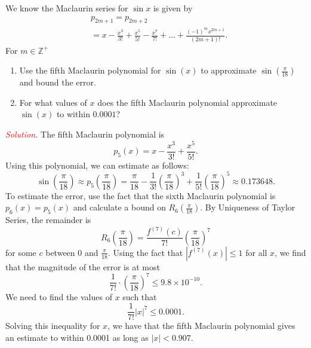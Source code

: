 \documentclass{report}
\begin{document}
    \pagebreak 
    \begin{exm}
        We know the Maclaurin series for $\sin{x}$ is given by
        \begin{align*}
            &p_{2m+1} = p_{2m+2} \\
            &=x-\frac{x^{3}}{3!} + \frac{x^{5}}{5!} - \frac{x^{7}}{7!}  + ... + \frac{(-1)^{m}x^{2m+1}}{(2m+1)!}
        .\end{align*}
        For $m \in \mathbb{Z^{+}}$
        \begin{enumerate}[label=(\alph*)]
            \item Use the fifth Maclaurin polynomial for  $\sin{(x)} $ to approximate  $\sin{\left(\frac{\pi}{18}\right)} $ and bound the error. 
            \item For what values of $x$ does the fifth Maclaurin polynomial approximate  $\sin{(x)}$ to within $0.0001$?
        \end{enumerate}
    \end{exm}
    \bigbreak \noindent 
    \textit{\textcolor{red}{Solution}.}
    The fifth Maclaurin polynomial is
    \[ p_5(x) = x - \frac{x^3}{3!} + \frac{x^5}{5!}. \]
    Using this polynomial, we can estimate as follows:
    \[ \sin\left(\frac{\pi}{18}\right) \approx p_5\left(\frac{\pi}{18}\right) = \frac{\pi}{18} - \frac{1}{3!}\left(\frac{\pi}{18}\right)^3 + \frac{1}{5!}\left(\frac{\pi}{18}\right)^5 \approx 0.173648. \]
    To estimate the error, use the fact that the sixth Maclaurin polynomial is \( p_6(x) = p_5(x) \) and calculate a bound on \( R_6\left(\frac{\pi}{18}\right) \). By Uniqueness of Taylor Series, the remainder is
    \[ R_6\left(\frac{\pi}{18}\right) = \frac{f^{(7)}(c)}{7!}\left(\frac{\pi}{18}\right)^7 \]
    for some \( c \) between 0 and \( \frac{\pi}{18} \). Using the fact that \( \left|f^{(7)}(x)\right| \leq 1 \) for all \( x \), we find that the magnitude of the error is at most
    \[ \frac{1}{7!} \cdot \left(\frac{\pi}{18}\right)^7 \leq 9.8 \times 10^{-10}. \]
    We need to find the values of \( x \) such that
    \[ \frac{1}{7!}|x|^7 \leq 0.0001. \]
    Solving this inequality for \( x \), we have that the fifth Maclaurin polynomial gives an estimate to within 0.0001 as long as \( |x| < 0.907. \)

    \pagebreak 
\end{document}

